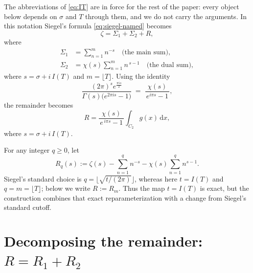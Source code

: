\documentclass[11pt]{article}
\theoremstyle{definition}
\begin{document}
The abbreviations of \eqref{eq:IT} are in force for the rest of
the paper: every object below depends on $\sigma$ and $T$ through them,
and we do not carry the arguments. In this notation Siegel's formula
\eqref{eq:siegel-named} becomes
\begin{equation}\label{eq:zeta-T}
\zeta
=
\Sigma_{1} + \Sigma_{2} + R,
\end{equation}
where
\begin{align}
\Sigma_{1} &= \sum_{n=1}^{m} n^{-s}
\quad\text{(the main sum)}, \\[4pt]
\Sigma_{2} &= \chi(s)
\sum_{n=1}^{m} n^{\,s-1}
\quad\text{(the dual sum)},
\end{align}
where $s=\sigma+i\,I(T)$ and $m=\lfloor T\rfloor$. Using the identity
\begin{equation}
\frac{(2\pi)^s e^{\tfrac{\pi i s}{2}}}{\Gamma(s)\bigl(e^{2\pi i s}-1\bigr)}
\;=\;
\frac{\chi(s)}{\,e^{i\pi s}-1\,},
\end{equation}
the remainder becomes
\begin{equation}\label{eq:R-T}
R
=
\frac{\chi(s)}{\,e^{\,i\pi s}-1\,}
\int_{C_2} g(x)\,\mathrm{d}x ,
\end{equation}
where $s=\sigma+i\,I(T)$.

For any integer $q\geq0$, let
\[
R_q(s):=\zeta(s)-\sum_{n=1}^{q}n^{-s}
-\chi(s)\sum_{n=1}^{q}n^{s-1}.
\]
Siegel's standard choice is $q=\lfloor\sqrt{t/(2\pi)}\rfloor$, whereas here
$t=I(T)$ and $q=m=\lfloor T\rfloor$; below we write $R:=R_m$. Thus the map
$t=I(T)$ is exact, but the construction combines that exact
reparameterization with a change from Siegel's standard cutoff.

\section{Decomposing the remainder: \texorpdfstring{$R=R_{1}+R_{2}$}{R = R1 + R2}}\label{sec:decomp}
\end{document}
